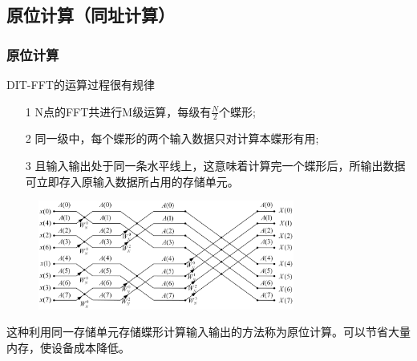 \documentclass[notheorems,compress,mathserif,table]{beamer}
\begin{document}
\subsection{原位计算（同址计算）}
\begin{frame}[shrink]\frametitle{原位计算}

DIT-FFT的运算过程很有规律
\begin{itemize}
  \item [1] N点的FFT共进行M级运算，每级有$\frac{N}{2}$个蝶形;
  \item [2] 同一级中，每个蝶形的两个输入数据只对计算本蝶形有用;
  \item [3] 且输入输出处于同一条水平线上，这意味着计算完一个蝶形后，所输出数据可立即存入原输入数据所占用的存储单元。
\end{itemize}
\begin{figure}[h]
  \centering
  \includegraphics[width=0.75\textwidth]{8dftThird.jpg}
\end{figure}
这种利用同一存储单元存储蝶形计算输入输出的方法称为原位计算。可以节省大量内存，使设备成本降低。
\end{frame}
%
%
%
\end{document}
